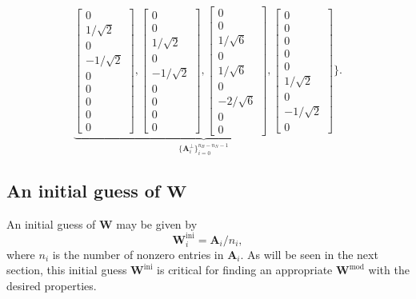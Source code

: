 \begin{equation}
	\underbrace{\begin{bmatrix} 0\\ 1/\sqrt{2}\\ 0\\ -1/\sqrt{2}\\ 0\\ 0\\ 0\\ 0\\ 0 \end{bmatrix},
		\begin{bmatrix} 0\\ 0\\ 1/\sqrt{2}\\ 0\\ -1/\sqrt{2}\\ 0\\ 0\\ 0\\ 0 \end{bmatrix},
		\begin{bmatrix} 0\\ 0\\ 1/\sqrt{6}\\ 0\\ 1/\sqrt{6}\\ 0\\ -2/\sqrt{6}\\ 0\\ 0 \end{bmatrix},
		\begin{bmatrix} 0\\ 0\\ 0\\ 0\\ 0\\ 1/\sqrt{2}\\ 0\\ -1/\sqrt{2}\\ 0 \end{bmatrix}}_{\{\mathbf{A}^\perp_i\}_{i=0}^{n_B-n_N-1}}
	\Biggr\}.
\end{equation}

\subsection{An initial guess of $\mathbf{W}$}
An initial guess of $\mathbf{W}$ may be given by
\begin{equation}
	\mathbf{W}^\text{ini}_i=\mathbf{A}_i/n_i,\label{eq:initial_guess}
\end{equation}
where $n_i$ is the number of nonzero entries in $\mathbf{A}_i$. As will be seen in the next section, this initial guess $\mathbf{W}^\text{ini}$ is critical for finding an appropriate $\mathbf{W}^\text{mod}$ with the desired properties.

